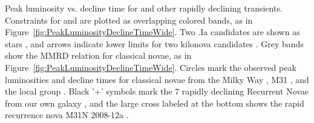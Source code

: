 \label{fig:PeakLuminosityDeclineTime}
Peak luminosity vs. decline time for \spock and other rapidly
declining transients.  Constraints for \spockone and \spocktwo are
plotted as overlapping colored bands, as in
Figure~\ref{fig:PeakLuminosityDeclineTimeWide}.  Two .Ia candidates
are shown as stars \citep{Kasliwal:2010,Poznanski:2010}, and arrows
indicate lower limits for two kilonova
candidates \citep{Perley:2009,Tanvir:2013}.  Grey bands show the MMRD
relation for classical novae, as in
Figure~\ref{fig:PeakLuminosityDeclineTimeWide}.  Circles mark the
observed peak luminosities and decline times for classical novae from
the Milky Way \citep{Downes:2000}, M31 \citep{Shafter:2011}, and the
local group \citep{Kasliwal:2011}.  Black '+' symbols mark the 7 rapidly declining Recurrent Novae from our own galaxy \citep{Schaefer:2010}, and the large cross labeled at the bottom shows the rapid recurrence nova
M31N 2008-12a \citep{Tang:2014,Darnley:2015}.
